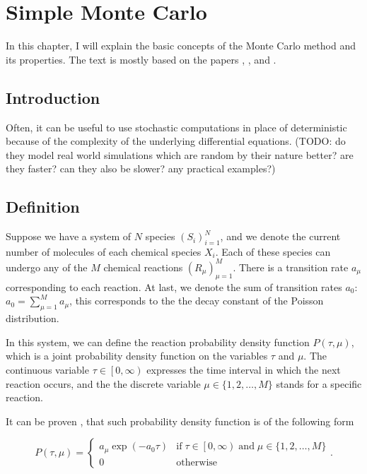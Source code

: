 \chapter{Simple Monte Carlo}

In this chapter, I will explain the basic concepts of the Monte Carlo method and its properties. The text is mostly based on the papers \cite{gillespie76}, \cite{gillespie77}, and \cite{tiago20}.

\section{Introduction}

Often, it can be useful to use stochastic computations in place of deterministic because of the complexity of the underlying differential equations. (TODO: do they model real world simulations which are random by their nature better? are they faster? can they also be slower? any practical examples?)

\section{Definition}

Suppose we have a system of $N$ species $(S_i)_{i=1}^N$, and we denote the current number of molecules of each chemical species $X_i$. Each of these species can undergo any of the $M$ chemical reactions $(R_\mu)_{\mu=1}^M$. There is a transition rate $a_\mu$ corresponding to each reaction. At last, we denote the sum of transition rates $a_0$: $a_0 = \sum_{\mu=1}^M a_\mu$, this corresponds to the the decay constant of the Poisson distribution.

In this system, we can define the reaction probability density function $P(\tau, \mu)$, which is a joint probability density function on the variables $\tau$ and $\mu$. The continuous variable $\tau \in \left[ 0, \infty \right)$ expresses the time interval in which the next reaction occurs, and the the discrete variable $\mu \in \{ 1, 2, \ldots, M \}$ stands for a specific reaction.

It can be proven \citep{gillespie76}, that such probability density function is of the following form

\[
P(\tau, \mu) = \left\{
\begin{array}{ll}
     a_\mu\exp{\left(-a_0\tau\right)} & \mathrm{if}\;\tau \in \left[0, \infty\right) \;\mathrm{and}\; \mu \in \{ 1, 2, \ldots, M \} \\
     0 & \mathrm{otherwise}
\end{array}
\right. .
\]

